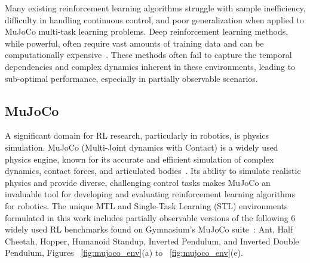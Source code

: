 \documentclass[sigconf]{acmart}
\begin{document}
Many existing reinforcement learning algorithms struggle with sample 
inefficiency, difficulty in handling continuous control, and poor 
generalization when applied to MuJoCo multi-task learning problems. 
Deep reinforcement learning methods, while powerful, often require vast 
amounts of training data and can be computationally expensive~\cite{Mnih07}. These 
methods often fail to capture the temporal dependencies and complex dynamics 
inherent in these environments, leading to sub-optimal performance, especially 
in partially observable scenarios.

\subsection{MuJoCo}
A significant domain for RL research, particularly in robotics, is physics 
simulation. MuJoCo (Multi-Joint dynamics with Contact) is a widely used physics 
engine, known for its accurate and efficient simulation of complex dynamics, 
contact forces, and articulated bodies~\cite{Todorov07}. Its ability to simulate realistic 
physics and provide diverse, challenging control tasks makes MuJoCo an invaluable 
tool for developing and evaluating reinforcement learning algorithms for robotics. 
The unique MTL and Single-Task Learning (STL) environments formulated in this work 
includes partially observable versions of the following 6 widely used RL benchmarks 
found on Gymnasium's MuJoCo suite~\cite{Towers07}: Ant, Half Cheetah, Hopper, Humanoid Standup, 
Inverted Pendulum, and Inverted Double Pendulum, Figures ~\ref{fig:mujoco_env}(a) to ~\ref{fig:mujoco_env}(e).
\end{document}
